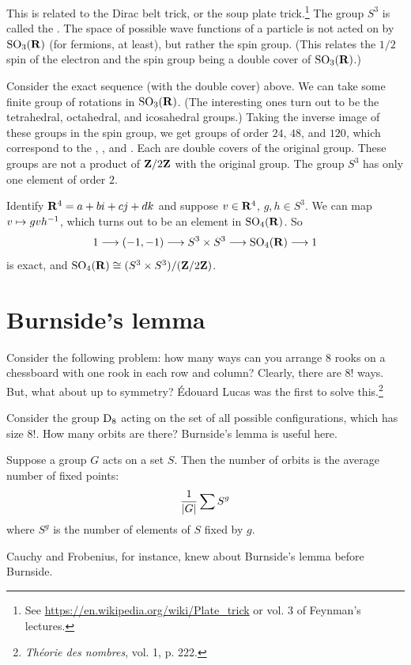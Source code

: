\documentclass[11pt, oneside]{amsart}
\begin{document}
This is related to the Dirac belt trick, or the soup plate trick.\footnote{See \url{https://en.wikipedia.org/wiki/Plate_trick} or vol. $3$ of Feynman's lectures.} %
The group $S^3$ is called the . The space of possible wave functions of a particle is not acted on by $\operatorname{SO}_3(\mathbf R)$ (for fermions, at least), but rather the spin group. (This relates the $1/2$ spin of the electron and the spin group being a double cover of $\operatorname{SO}_3(\mathbf R)$.) 

Consider the exact sequence (with the double cover) above. We can take some finite group of rotations in $\operatorname{SO}_3(\mathbf R)$. (The interesting ones turn out to be the tetrahedral, octahedral, and icosahedral groups.) Taking the inverse image of these groups in the spin group, we get groups of order $24$, $48$, and $120$, which correspond to the , , and . Each are double covers of the original group. These groups are not a product of $\mathbf Z/2\mathbf Z$ with the original group. The group $S^3$ has only one element of order $2$.

Identify $\mathbf R^4 = a + bi + cj + dk$ and suppose $v\in \mathbf R^4$, $g,h\in S^3$. We can map $v\mapsto gvh^{-1}$, which turns out to be an element in $\operatorname{SO}_4(\mathbf R)$. So  
$$
1\longrightarrow (-1,-1)\longrightarrow S^3 \times S^3 \longrightarrow \operatorname{SO}_4(\mathbf R) \longrightarrow 1
$$
is exact, and $\operatorname{SO}_4(\mathbf R) \cong (S^3 \times S^3)/(\mathbf Z/2\mathbf Z)$.

\section{Burnside's lemma}
Consider the following problem: how many ways can you arrange $8$ rooks on a chessboard with one rook in each row and column? Clearly, there are $8!$ ways. But, what about up to symmetry? \'Edouard Lucas was the first to solve this.\footnote{\textit{Théorie des nombres}, vol. 1, p. 222.}

Consider the group $\operatorname{D}_8$ acting on the set of all possible configurations, which has size $8!$. How many orbits are there? Burnside's lemma is useful here.
\begin{lemma}[Burnside]
Suppose a group $G$ acts on a set $S$. Then the number of orbits is the average number of fixed points: 
$$
\frac{1}{\left \lvert G \right \rvert} \sum S^g
$$
where $S^g$ is the number of elements of $S$ fixed by $g$.
\end{lemma}

Cauchy and Frobenius, for instance, knew about Burnside's lemma before Burnside.
\end{document}
